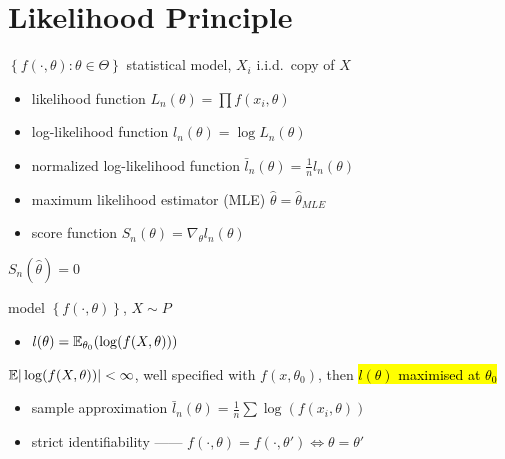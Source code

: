 \section{Likelihood Principle}\label{sec:likelihood-principle}

\begin{setting}
    $\left\{ f(\cdot, \theta)  : \theta \in \Theta \right\}$ statistical model, $X_i$ i.i.d.\  copy of $X$
\end{setting}

\begin{itemize}
    \item likelihood function $L_n(\theta) = \prod f(x_i, \theta)$
    \item log-likelihood function $l_n(\theta) = \log L_n(\theta)$
    \item normalized log-likelihood function $\bar{l}_n(\theta) = \frac{1}{n}l_n(\theta)$
\end{itemize}

\begin{itemize}
    \item maximum likelihood estimator (MLE) $\hat{\theta} = \hat{\theta}_{MLE}$
    \item score function $S_n(\theta) = \nabla_\theta l_n(\theta)$
\end{itemize}

\begin{fact}
    $S_{n}(\hat{\theta}) = 0$
\end{fact}

\begin{setting}
    model $\left\{ f(\cdot, \theta) \right\}$, $X \sim P$
\end{setting}

\begin{itemize}
    \item $l(\theta) = \mathbb{E}_{\theta_0}(\log(f(X, \theta)))$
\end{itemize}

\begin{thm}
    $\mathbb{E}|\log(f(X, \theta))| < \infty$, well specified with $f(x, \theta_0)$, then \hl{$l(\theta)$ maximised at $\theta_0$}
\end{thm}

\begin{itemize}
    \item sample approximation $\bar{l}_n(\theta) = \frac{1}{n} \sum \log(f(x_i, \theta))$
    \item strict identifiability ------ $f(\cdot, \theta) = f(\cdot, \theta') \iff \theta = \theta'$
\end{itemize}

